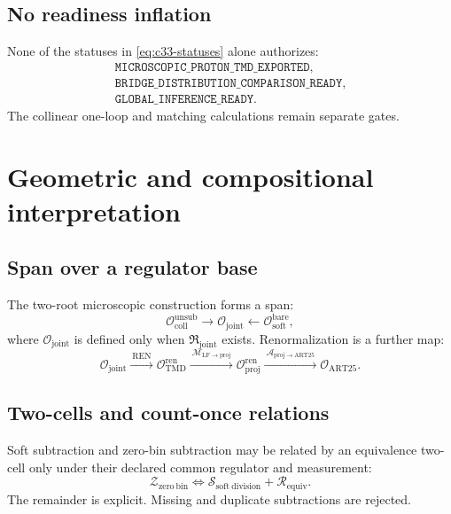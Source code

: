 \documentclass[11pt]{article}
\newcommand{\TMD}{\ensuremath{\mathrm{TMD}}}
\newcommand{\cO}{\mathcal O}
\newcommand{\cM}{\mathcal M}
\newcommand{\cR}{\mathcal R}
\newcommand{\cS}{\mathcal S}
\newcommand{\cZ}{\mathcal Z}
\newcommand{\cA}{\mathcal A}
\newcommand{\Coll}{\ensuremath{\mathrm{coll}}}
\newcommand{\Soft}{\ensuremath{\mathrm{soft}}}
\newcommand{\Proj}{\ensuremath{\mathrm{proj}}}
\newcommand{\ART}{\ensuremath{\mathrm{ART25}}}
\newcommand{\Bare}{\ensuremath{\mathrm{bare}}}
\newcommand{\Ren}{\ensuremath{\mathrm{ren}}}
\newcommand{\Unsub}{\ensuremath{\mathrm{unsub}}}
\begin{document}
\subsection{No readiness inflation}

None of the statuses in \cref{eq:c33-statuses} alone authorizes:
\begin{equation}
 \begin{gathered}
 \texttt{MICROSCOPIC\_PROTON\_TMD\_EXPORTED},\\
 \texttt{BRIDGE\_DISTRIBUTION\_COMPARISON\_READY},\\
 \texttt{GLOBAL\_INFERENCE\_READY}.
 \end{gathered}
 \label{eq:forbidden-status}
\end{equation}
The collinear one-loop and matching calculations remain separate gates.

\section{Geometric and compositional interpretation}
\label{sec:geometry}

\subsection{Span over a regulator base}

The two-root microscopic construction forms a span:
\begin{equation}
 \cO_{\Coll}^{\Unsub}
 \longrightarrow
 \cO_{\mathrm{joint}}
 \longleftarrow
 \cO_{\Soft}^{\Bare},
 \label{eq:operator-span}
\end{equation}
where \(\cO_{\mathrm{joint}}\) is defined only when \(\mathfrak R_{\mathrm{joint}}\) exists.  Renormalization is a further map:
\begin{equation}
 \cO_{\mathrm{joint}}
 \xrightarrow{\ \mathrm{REN}\ }
 \cO_{\TMD}^{\Ren}
 \xrightarrow{\ \cM_{\mathrm{LF}\to\Proj}\ }
 \cO_{\Proj}^{\Ren}
 \xrightarrow{\ \cA_{\Proj\to\ART}\ }
 \cO_{\ART}.
 \label{eq:operator-chain}
\end{equation}

\subsection{Two-cells and count-once relations}

Soft subtraction and zero-bin subtraction may be related by an equivalence two-cell only under their declared common regulator and measurement:
\begin{equation}
 \cZ_{\mathrm{zero\ bin}}
 \Longleftrightarrow
 \cS_{\mathrm{soft\ division}}
 +
 \cR_{\mathrm{equiv}}.
 \label{eq:zero-soft-equivalence}
\end{equation}
The remainder is explicit.  Missing and duplicate subtractions are rejected.
\end{document}
